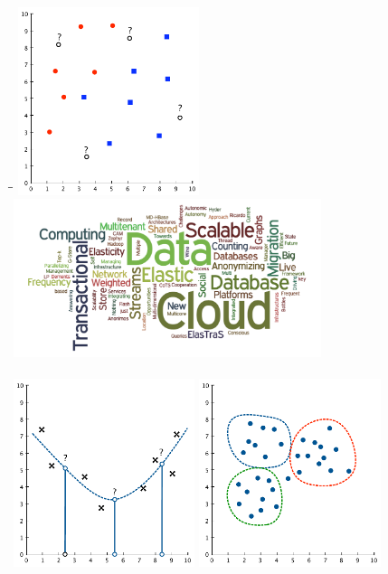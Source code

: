 \documentclass[landscape,footrule]{foils}
\begin{document}
\titlefoil


\enlargethispage{3cm}
\begin{tabbing}
 \hspace*{2cm}\=\hspace*{10cm}\=\kill
   \>\includegraphics[height = 5.5cm]{classification} \> \includegraphics[width = 9cm]{word-cloud}\\  \vspace*{1cm} \\
   \>\includegraphics[height = 5.5cm]{regression}   \>  \includegraphics[height =5.5cm]{clustering}\\
\end{tabbing}
\end{document}
